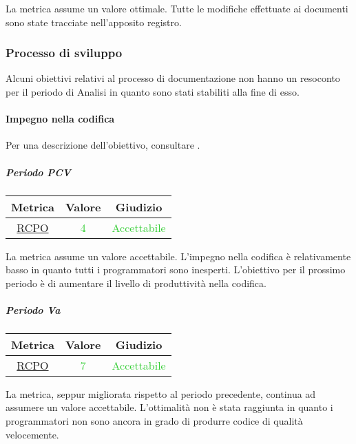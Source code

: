 					La metrica assume un valore ottimale. Tutte le modifiche effettuate ai documenti sono state tracciate nell'apposito registro.
					\newpage
					
		\subsubsection{Processo di sviluppo}
			Alcuni obiettivi relativi al processo di documentazione non hanno un resoconto per il periodo di Analisi in quanto sono stati stabiliti alla fine di esso.
				

				
				\paragraph{Impegno nella codifica}
					Per una descrizione dell'obiettivo, consultare .
					
					\subparagraph{Periodo PCV} 
					\begin{table}[H]
						\centering
						\begin{tabular}{  c | c | c}
							\hline
							\textbf{Metrica} & \textbf{Valore} & \textbf{Giudizio} \\
							\hline
							\hyperref[MMC]{RCPO}   & \textcolor{LimeGreen}{4}          & \textcolor{LimeGreen}{Accettabile} \\ \hline
						\end{tabular} 
					\end{table}
				
				La metrica assume un valore accettabile. L'impegno nella codifica è relativamente basso in quanto tutti i programmatori sono inesperti. L'obiettivo per il prossimo periodo è di aumentare il livello di produttività nella codifica. 
				
				\subparagraph{Periodo Va} 
				\begin{table}[H]
					\centering
					\begin{tabular}{  c | c | c}
						\hline
						\textbf{Metrica} & \textbf{Valore} & \textbf{Giudizio} \\
						\hline
						\hyperref[MMC]{RCPO}   & \textcolor{LimeGreen}{7}          & \textcolor{LimeGreen}{Accettabile} \\ \hline
					\end{tabular} 
				\end{table}
				
				La metrica, seppur migliorata rispetto al periodo precedente, continua ad assumere un valore accettabile. L'ottimalità non è stata raggiunta in quanto i programmatori non sono ancora in grado di produrre codice di qualità velocemente.
				
